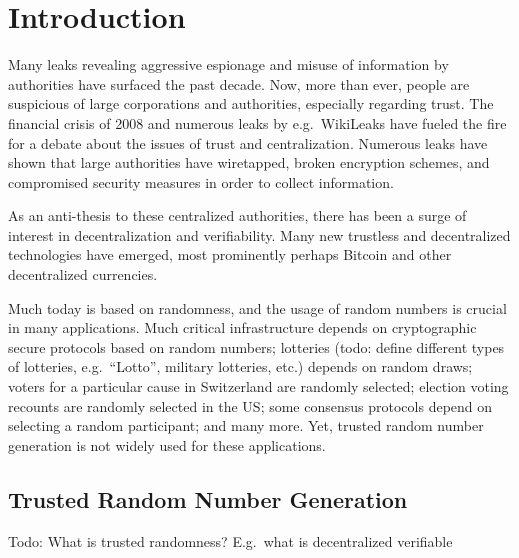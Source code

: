 \section{Introduction}\label{cha:introduction}

Many leaks revealing aggressive espionage and misuse of information by authorities have surfaced the past decade. Now, more than ever, people are suspicious of large corporations and authorities, especially regarding trust. The financial crisis of 2008 and numerous leaks by e.g.\ WikiLeaks have fueled the fire for a debate about the issues of trust and centralization. Numerous leaks have shown that large authorities have wiretapped, broken encryption schemes, and compromised security measures in order to collect information.

As an anti-thesis to these centralized authorities, there has been a surge of interest in decentralization and verifiability. Many new trustless and decentralized technologies have emerged, most prominently perhaps Bitcoin and other decentralized currencies.

Much today is based on randomness, and the usage of random numbers is crucial in many applications. Much critical infrastructure depends on cryptographic secure protocols based on random numbers; lotteries (todo: define different types of lotteries, e.g.\ \enquote{Lotto}, military lotteries, etc.) depends on random draws; voters for a particular cause in Switzerland are randomly selected; election voting recounts are randomly selected in the US\@; some consensus protocols depend on selecting a random participant; and many more. Yet, trusted random number generation is not widely used for these applications. 

\subsection{Trusted Random Number Generation} %
Todo: What is trusted randomness? E.g.\ what is decentralized verifiable



